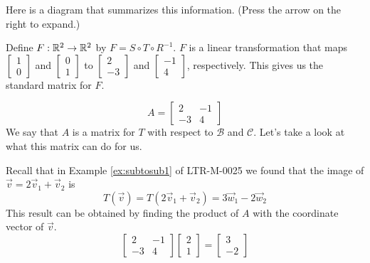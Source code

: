 \documentclass{ximera}
\begin{document}
\begin{exploration}
\begin{expandable}
\begin{center}
\end{center}
\end{expandable}

Here is a diagram that summarizes this information.  (Press the arrow on the right to expand.)

Define $F:\mathbb{R}^2\rightarrow \mathbb{R}^2$ by $F=S\circ T\circ R^{-1}$.  $F$ is a linear transformation that maps $\begin{bmatrix}1\\0\end{bmatrix}$ and $\begin{bmatrix}0\\1\end{bmatrix}$ to $\begin{bmatrix}2\\-3\end{bmatrix}$ and $\begin{bmatrix}-1\\4\end{bmatrix}$, respectively.  This gives us the standard matrix for $F$.


$$A=\begin{bmatrix}2&-1\\-3&4\end{bmatrix}$$
We say that $A$ is a matrix for $T$ with respect to $\mathcal{B}$ and $\mathcal{C}$.  Let's take a look at what this matrix can do for us.

Recall that in Example \ref{ex:subtosub1} of LTR-M-0025 we found that the image of $\vec{v}=2\vec{v}_1+\vec{v}_2$ is $$T(\vec{v})=T(2\vec{v}_1+\vec{v}_2)=3\vec{w}_1-2\vec{w}_2$$
This result can be obtained by finding the product of $A$ with the coordinate vector of  $\vec{v}$.
$$\begin{bmatrix}2&-1\\-3&4\end{bmatrix}\begin{bmatrix}2\\1\end{bmatrix}=\begin{bmatrix}3\\-2\end{bmatrix}$$


\end{exploration}
\end{document}
